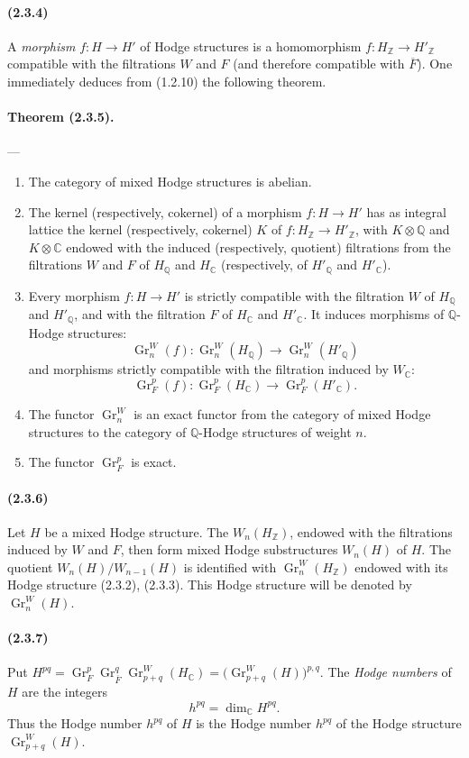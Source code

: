 \documentclass[10pt]{article}
\newcommand{\C}{\mathbb C}
\newcommand{\Q}{\mathbb Q}
\newcommand{\Z}{\mathbb Z}
\newcommand{\Gr}{\operatorname{Gr}}
\begin{document}
\paragraph{(2.3.4)} A \emph{morphism} $f:H\to H'$ of Hodge structures is a homomorphism $f:H_\Z\to H'_\Z$ compatible with the filtrations $W$ and $F$ (and therefore compatible with $\overline F$). One immediately deduces from (1.2.10) the following theorem.

\paragraph{Theorem (2.3.5).} --- {\itshape
\begin{enumerate}[label=(\roman*)]
\item The category of mixed Hodge structures is abelian.
\item The kernel (respectively, cokernel) of a morphism $f:H\to H'$ has as integral lattice the kernel (respectively, cokernel) $K$ of $f:H_\Z\to H'_\Z$, with $K\otimes\Q$ and $K\otimes\C$ endowed with the induced (respectively, quotient) filtrations from the filtrations $W$ and $F$ of $H_\Q$ and $H_\C$ (respectively, of $H'_\Q$ and $H'_\C$).
\item Every morphism $f:H\to H'$ is strictly compatible with the filtration $W$ of $H_\Q$ and $H'_\Q$, and with the filtration $F$ of $H_\C$ and $H'_\C$. It induces morphisms of $\Q$-Hodge structures:
\[
\Gr_n^W(f):\Gr_n^W(H_\Q)\longrightarrow\Gr_n^W(H'_\Q)
\]
and morphisms strictly compatible with the filtration induced by $W_\C$:
\[
\Gr_F^p(f):\Gr_F^p(H_\C)\longrightarrow\Gr_F^p(H'_\C).
\]
\item The functor $\Gr_n^W$ is an exact functor from the category of mixed Hodge structures to the category of $\Q$-Hodge structures of weight $n$.
\item The functor $\Gr_F^p$ is exact.
\end{enumerate}}

\paragraph{(2.3.6)} Let $H$ be a mixed Hodge structure. The $W_n(H_\Z)$, endowed with the filtrations induced by $W$ and $F$, then form mixed Hodge substructures $W_n(H)$ of $H$. The quotient $W_n(H)/W_{n-1}(H)$ is identified with $\Gr_n^W(H_\Z)$ endowed with its Hodge structure (2.3.2), (2.3.3). This Hodge structure will be denoted by $\Gr_n^W(H)$.

\paragraph{(2.3.7)} Put $H^{pq}=\Gr_F^p\Gr_{\overline F}^q\Gr_{p+q}^W(H_\C)=\bigl(\Gr_{p+q}^W(H)\bigr)^{p,q}$. The \emph{Hodge numbers} of $H$ are the integers
\[
h^{pq}=\dim_\C H^{pq}.
\]
Thus the Hodge number $h^{pq}$ of $H$ is the Hodge number $h^{pq}$ of the Hodge structure $\Gr_{p+q}^W(H)$.
\end{document}
